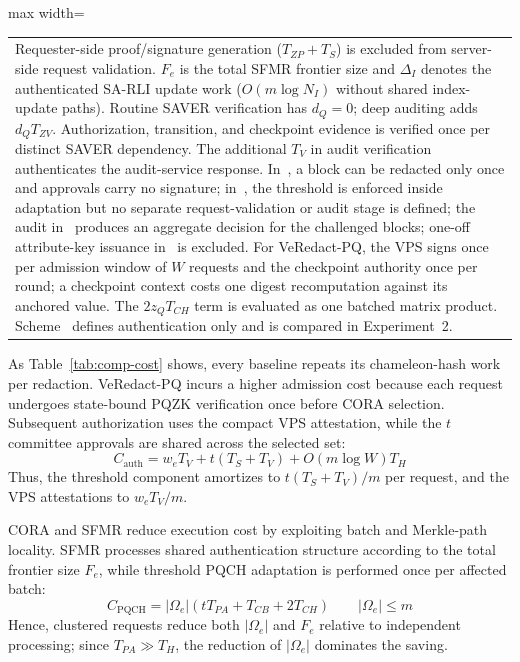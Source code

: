 \documentclass[lettersize,journal]{IEEEtran}
\begin{document}
\begin{table}[t]
\begin{adjustbox}{max width=\textwidth}
\begin{tabular}{lcccc}
\bottomrule
\multicolumn{5}{p{0.96\textwidth}}{\footnotesize
Requester-side proof/signature generation ($T_{ZP}+T_S$) is excluded
from server-side request validation. $F_e$ is the total SFMR frontier
size and $\Delta_I$ denotes the authenticated SA-RLI update work
($O(m\log N_I)$ without shared index-update paths). Routine SAVER
verification has $d_Q=0$; deep auditing adds $d_QT_{ZV}$.
Authorization, transition, and checkpoint evidence is verified once
per distinct SAVER dependency. The additional $T_V$ in audit
verification authenticates the audit-service response. In~\cite{ref1},
a block can be redacted only once and approvals carry no signature;
in~\cite{ref27}, the threshold is enforced inside adaptation but no
separate request-validation or audit stage is defined; the audit
in~\cite{ref13} produces an aggregate decision for the challenged
blocks; one-off attribute-key issuance in~\cite{ref34} is excluded.
For VeRedact-PQ, the VPS signs once per admission window
of $W$ requests and the checkpoint authority once per round; a checkpoint
context costs one digest recomputation against its anchored value. The
$2z_QT_{CH}$ term is evaluated as one batched matrix product. Scheme~\cite{ref39} defines authentication only and is compared in
Experiment~2.}
\end{tabular}
\end{adjustbox}
\end{table}

As Table~\ref{tab:comp-cost} shows, every baseline repeats its
chameleon-hash work per redaction. VeRedact-PQ incurs a higher admission cost because each request
undergoes state-bound PQZK verification once before CORA selection.
Subsequent authorization uses the compact VPS attestation, while the
$t$ committee approvals are shared across the selected set:
\begin{equation}
C_{\mathrm{auth}}
=
w_eT_V+t(T_S+T_V)+O(m\log W)T_H
\label{eq:cauth}
\end{equation}
Thus, the threshold component amortizes to
$t(T_S+T_V)/m$ per request, and the VPS attestations to
$w_eT_V/m$.

CORA and SFMR reduce execution cost by exploiting batch and Merkle-path
locality. SFMR processes shared authentication structure according to
the total frontier size $F_e$, while threshold PQCH adaptation is
performed once per affected batch:
\begin{equation}
C_{\mathrm{PQCH}}
=
|\Omega_e|(tT_{PA}+T_{CB}+2T_{CH})
\qquad |\Omega_e|\leq m
\end{equation}
Hence, clustered requests reduce both $|\Omega_e|$ and $F_e$ relative
to independent processing; since $T_{PA}\gg T_H$, the reduction of
$|\Omega_e|$ dominates the saving.
\end{document}
